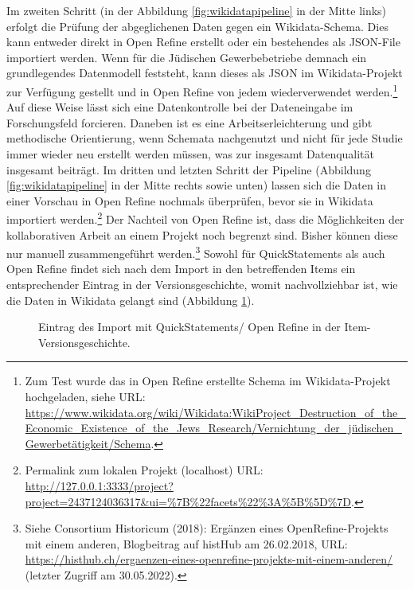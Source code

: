 Im zweiten Schritt (in der Abbildung \ref{fig:wikidatapipeline} in der Mitte links) erfolgt die Prüfung der abgeglichenen Daten gegen ein Wikidata-Schema. Dies kann entweder direkt in Open Refine erstellt oder ein bestehendes als JSON-File importiert werden. Wenn für die Jüdischen Gewerbebetriebe demnach ein grundlegendes Datenmodell feststeht, kann dieses als JSON im Wikidata-Projekt zur Verfügung gestellt und in Open Refine von jedem wiederverwendet werden.\footnote{Zum Test wurde das in Open Refine erstellte Schema im Wikidata-Projekt hochgeladen, siehe URL: \url{https://www.wikidata.org/wiki/Wikidata:WikiProject\_Destruction\_of\_the\_Economic\_Existence\_of\_the\_Jews\_Research/Vernichtung\_der\_jüdischen\_Gewerbetätigkeit/Schema}.} Auf diese Weise lässt sich eine Datenkontrolle bei der Dateneingabe im Forschungsfeld forcieren. Daneben ist es eine Arbeitserleichterung und gibt methodische Orientierung, wenn Schemata nachgenutzt und nicht für jede Studie immer wieder neu erstellt werden müssen, was zur insgesamt Datenqualität insgesamt beiträgt. Im dritten und letzten Schritt der Pipeline (Abbildung \ref{fig:wikidatapipeline} in der Mitte rechts sowie unten) lassen sich die Daten in einer Vorschau in Open Refine nochmals überprüfen, bevor sie in Wikidata importiert werden.\footnote{Permalink zum lokalen Projekt (localhost) URL: \url{http://127.0.0.1:3333/project?project=2437124036317\&ui=\%7B\%22facets\%22\%3A\%5B\%5D\%7D}.} Der Nachteil von Open Refine ist, dass die Möglichkeiten der kollaborativen Arbeit an einem Projekt noch begrenzt sind. Bisher können diese nur manuell zusammengeführt werden.\footnote{Siehe Consortium Historicum (2018): Ergänzen eines OpenRefine-Projekts mit einem anderen, Blogbeitrag auf histHub am 26.02.2018, URL: \url{https://histhub.ch/ergaenzen-eines-openrefine-projekts-mit-einem-anderen/} (letzter Zugriff am 30.05.2022).} Sowohl für QuickStatements als auch Open Refine findet sich nach dem Import in den betreffenden Items ein entsprechender Eintrag in der Versionsgeschichte, womit nachvollziehbar ist, wie die Daten in Wikidata gelangt sind (Abbildung \ref{fig:wikidataversions}).

\begin{figure}[h]
    \centering
    \caption{Eintrag des Import mit QuickStatements/ Open Refine in der Item-Versionsgeschichte.}
    \label{fig:wikidataversions}
\end{figure}

